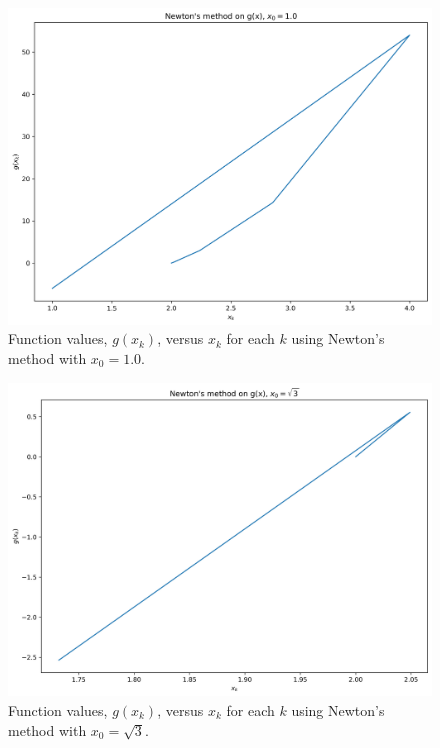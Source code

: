 \documentclass[11pt]{article}
\begin{document}
\begin{figure}[H]
	\centering
	\includegraphics[width=\linewidth]{../figures/Newtons_g_1.0}
	\caption{Function values, $g(x_k)$, versus $x_k$ for each $k$ using Newton's method with $x_0 = 1.0$.}
	\label{fig:newton_g_1.0}
\end{figure}

\begin{figure}[H]
	\centering
	\includegraphics[width=\linewidth]{../figures/Newtons_g_sqrt3}
	\caption{Function values, $g(x_k)$, versus $x_k$ for each $k$ using Newton's method with $x_0 = \sqrt{3}$.}
	\label{fig:newton_g_sqrt3}
\end{figure}

\end{document}
